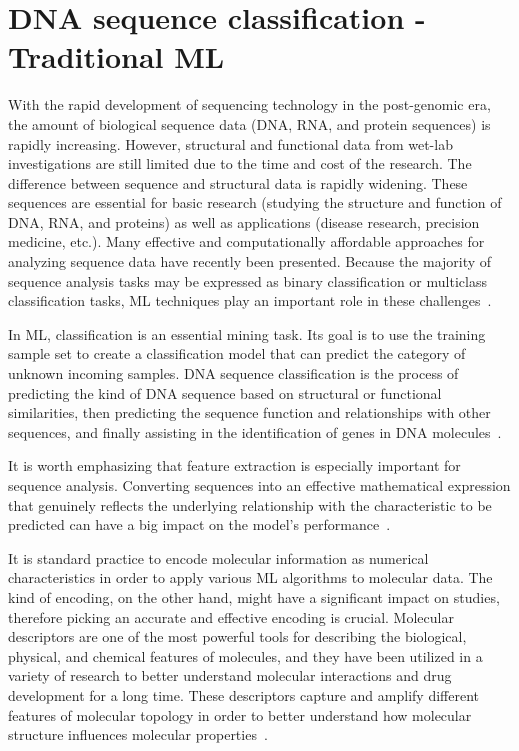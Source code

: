 \section{DNA sequence classification - Traditional ML}

With the rapid development of sequencing technology in the post-genomic era, the amount of biological sequence data (\gls{DNA}, \gls{RNA}, and protein sequences) is rapidly increasing. However, structural and functional data from wet-lab investigations are still limited due to the time and cost of the research. The difference between sequence and structural data is rapidly widening. These sequences are essential for basic research (studying the structure and function of \gls{DNA}, \gls{RNA}, and proteins) as well as applications (disease research, precision medicine, etc.). Many effective and computationally affordable approaches for analyzing sequence data have recently been presented. Because the majority of sequence analysis tasks may be expressed as binary classification or multiclass classification tasks, \gls{ML} techniques play an important role in these challenges~\cite{Liu2019BioSeq-Analysis:Approaches}.

In \gls{ML}, classification is an essential mining task. Its goal is to use the training sample set to create a classification model that can predict the category of unknown incoming samples. \gls{DNA} sequence classification is the process of predicting the kind of \gls{DNA} sequence based on structural or functional similarities, then predicting the sequence function and relationships with other sequences, and finally assisting in the identification of genes in \gls{DNA} molecules~\cite{Yang2020ReviewDNA}.

It is worth emphasizing that feature extraction is especially important for sequence analysis. Converting sequences into an effective mathematical expression that genuinely reflects the underlying relationship with the characteristic to be predicted can have a big impact on the model's performance~\cite{Chen2020ILearn:Data}.

It is standard practice to encode molecular information as numerical characteristics in order to apply various \gls{ML} algorithms to molecular data. The kind of encoding, on the other hand, might have a significant impact on studies, therefore picking an accurate and effective encoding is crucial. Molecular descriptors are one of the most powerful tools for describing the biological, physical, and chemical features of molecules, and they have been utilized in a variety of research to better understand molecular interactions and drug development for a long time. These descriptors capture and amplify different features of molecular topology in order to better understand how molecular structure influences molecular properties~\cite{Dong2018PyBioMed:Interactions}.

